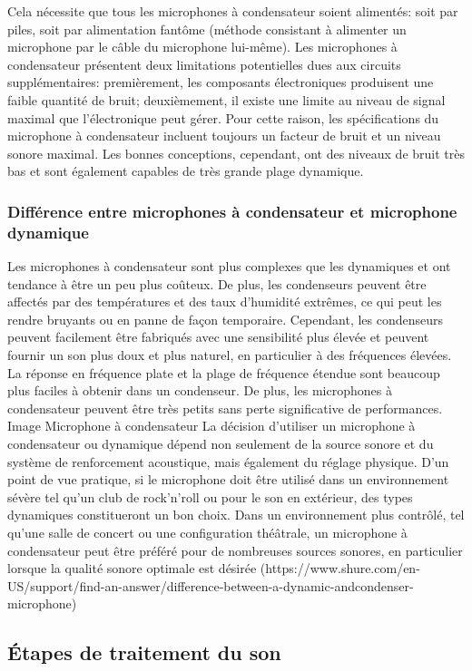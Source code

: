 \documentclass[a4paper, 12pt]{book}
\begin{document}
Cela nécessite que tous les microphones à condensateur soient alimentés: soit par piles, soit par alimentation fantôme (méthode consistant à alimenter un microphone par le câble du microphone lui-même). Les microphones à condensateur présentent deux limitations potentielles dues aux circuits supplémentaires: premièrement, les composants électroniques produisent une faible quantité de bruit; deuxièmement, il existe une limite au niveau de signal maximal que l'électronique peut gérer. Pour cette raison, les spécifications du microphone à condensateur incluent toujours un facteur de bruit et un niveau sonore maximal. Les bonnes conceptions, cependant, ont des niveaux de bruit très bas et sont également capables de très grande plage dynamique.

\subsubsection{Différence entre microphones à condensateur et microphone dynamique}

Les microphones à condensateur sont plus complexes que les dynamiques et ont tendance à être un peu plus coûteux. De plus, les condenseurs peuvent être affectés par des températures et des taux d'humidité extrêmes, ce qui peut les rendre bruyants ou en panne de façon temporaire. Cependant, les condenseurs peuvent facilement être fabriqués avec une sensibilité plus élevée et peuvent fournir un son plus doux et plus naturel, en particulier à des fréquences élevées. La réponse en fréquence plate et la plage de fréquence étendue sont beaucoup plus faciles à obtenir dans un condenseur. De plus, les microphones à condensateur peuvent être très petits sans perte significative de performances. Image Microphone à condensateur La décision d'utiliser un microphone à condensateur ou dynamique dépend non seulement de la source sonore et du système de renforcement acoustique, mais également du réglage physique. D'un point de vue pratique, si le microphone doit être utilisé dans un environnement sévère tel qu'un club de rock'n'roll ou pour le son en extérieur, des types dynamiques constitueront un bon choix. Dans un environnement plus contrôlé, tel qu'une salle de concert ou une configuration théâtrale, un microphone à condensateur peut être préféré pour de nombreuses sources sonores, en particulier lorsque la qualité sonore optimale est désirée (https://www.shure.com/en-US/support/find-an-answer/difference-between-a-dynamic-andcondenser-microphone)

\subsection{Étapes de traitement du son}
\end{document}

